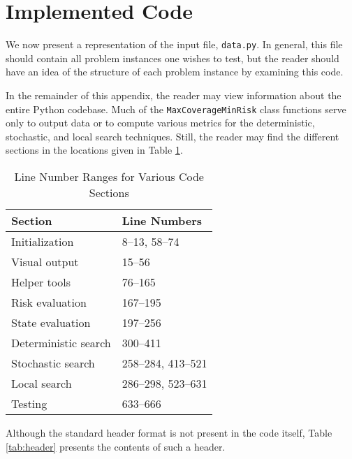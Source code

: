 \documentclass[../main.tex]{subfiles}
\begin{document}
\section{Implemented Code}\label{app:code}

We now present a representation of the input file, \texttt{data.py}. In general, this file should contain all problem instances one wishes to test, but the reader should have an idea of the structure of each problem instance by examining this code.



\onecolumn

In the remainder of this appendix, the reader may view information about the entire Python codebase. Much of the \texttt{MaxCoverageMinRisk} class functions serve only to output data or to compute various metrics for the deterministic, stochastic, and local search techniques. Still, the reader may find the different sections in the locations given in Table \ref{tab:code-details}.

\begin{table}[h!]
\centering
\caption{Line Number Ranges for Various Code Sections}
\label{tab:code-details}
\begin{tabular}{|l|l|}
\hline
\textbf{Section} & \textbf{Line Numbers}  \\
\hline
Initialization       & 8--13, 58--74      \\
Visual output        & 15--56             \\
Helper tools         & 76--165            \\
Risk evaluation      & 167--195           \\
State evaluation     & 197--256           \\
Deterministic search & 300--411           \\
Stochastic search    & 258--284, 413--521 \\
Local search         & 286--298, 523--631 \\
Testing              & 633--666           \\
\hline
\end{tabular}
\end{table}

Although the standard header format is not present in the code itself, Table \ref{tab:header} presents the contents of such a header.
\end{document}
